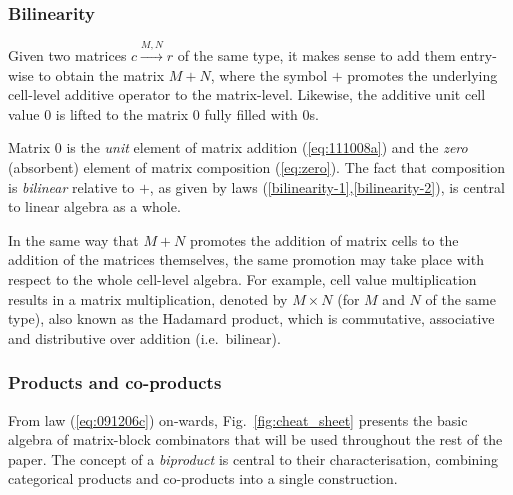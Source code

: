 \documentclass[sigplan,screen]{acmart}\settopmatter{}
\def\doc{paper}
\begin{document}
\subsubsection{Bilinearity}
Given two matrices $c \xrightarrow{M, N} r$ of the same type, it makes sense to add them entry-wise to obtain the matrix $M+N$, where the symbol $+$ promotes the underlying cell-level additive operator to the matrix-level. Likewise, the additive unit cell value $0$ is lifted to the matrix $0$ fully filled with $0$s.

Matrix $0$ is the \emph{unit} element of matrix addition (\ref{eq:111008a}) and the \emph{zero} (absorbent) element of matrix composition (\ref{eq:zero}).
The fact that composition is \emph{bilinear} relative to $+$, as given by laws (\ref{bilinearity-1},\ref{bilinearity-2}), is central to linear algebra as a whole.

In the same way that $M + N$ promotes the addition of matrix cells to the addition of the matrices themselves, the same promotion may take place with respect to the whole cell-level algebra. For example, cell value multiplication results in a matrix multiplication, denoted by $M \times N$
(for $M$ and $N$ of the same type), also known as the Hadamard product, which is commutative, associative and distributive over addition (i.e.\ bilinear).

\subsubsection{Products and co-products}\label{laop-laws}

From law (\ref{eq:091206c}) on-wards, Fig.~\ref{fig:cheat_sheet} presents the basic algebra of matrix-block combinators that will be used throughout the rest of the \doc. The concept of a \emph{biproduct} is central to their characterisation,
combining categorical products and co-products into a single construction.
\end{document}
